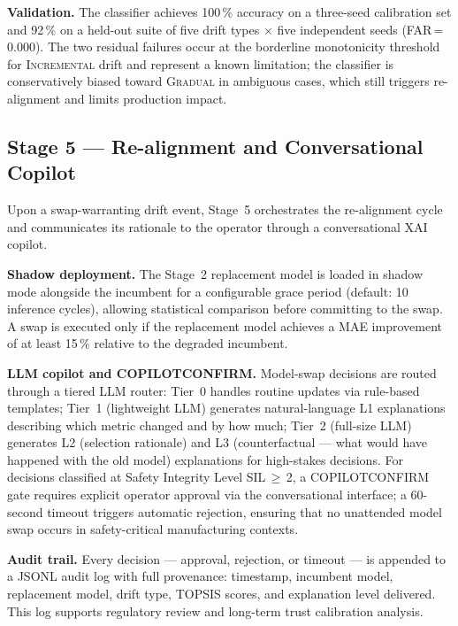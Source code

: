 \documentclass[12pt,a4paper]{article}
\begin{document}
\textbf{Validation.}
The classifier achieves 100\,\% accuracy on a three-seed
calibration set and 92\,\% on a held-out suite of five drift types
$\times$ five independent seeds (FAR\,=\,0.000).
The two residual failures occur at the borderline monotonicity
threshold for \textsc{Incremental} drift and represent a known
limitation; the classifier is conservatively biased toward
\textsc{Gradual} in ambiguous cases, which still triggers
re-alignment and limits production impact.

\subsection{Stage 5 — Re-alignment and Conversational Copilot}
\label{subsec:s5}

Upon a swap-warranting drift event, Stage~5 orchestrates the
re-alignment cycle and communicates its rationale to the operator
through a conversational XAI copilot.

\textbf{Shadow deployment.}
The Stage~2 replacement model is loaded in shadow mode alongside
the incumbent for a configurable grace period (default: 10 inference
cycles), allowing statistical comparison before committing to the swap.
A swap is executed only if the replacement model achieves a MAE
improvement of at least 15\,\% relative to the degraded incumbent.

\textbf{LLM copilot and COPILOTCONFIRM.}
Model-swap decisions are routed through a tiered LLM router:
Tier~0 handles routine updates via rule-based templates; Tier~1
(lightweight LLM) generates natural-language L1 explanations
describing which metric changed and by how much; Tier~2
(full-size LLM) generates L2 (selection rationale) and L3
(counterfactual --- what would have happened with the old model)
explanations for high-stakes decisions.
For decisions classified at Safety Integrity Level SIL\,$\geq$\,2,
a COPILOTCONFIRM gate requires explicit operator approval via
the conversational interface; a 60-second timeout triggers
automatic rejection, ensuring that no unattended model swap
occurs in safety-critical manufacturing contexts.

\textbf{Audit trail.}
Every decision --- approval, rejection, or timeout --- is appended
to a JSONL audit log with full provenance: timestamp, incumbent
model, replacement model, drift type, TOPSIS scores, and
explanation level delivered.
This log supports regulatory review and long-term trust calibration
analysis.

\end{document}
